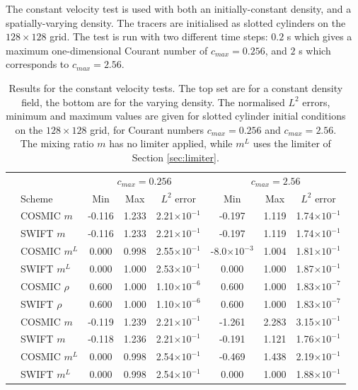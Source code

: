 \documentclass[11pt,a4paper]{article}
\begin{document}
The constant velocity test is used with both an initially-constant density, and a spatially-varying density.
The tracers are initialised as slotted cylinders on the $128\times 128$ grid.
The test is run with two different time steps: $0.2$ s which gives a maximum one-dimensional Courant number of $c_{max}=0.256$, and $2$ s which corresponds to $c_{max}=2.56$.
\\
\begin{table}[h!]
\small
\begin{center}
\begin{tabular}{| c | l | c c c | c c c | } \hline
  & & \multicolumn{3}{c|}{$c_{max}=0.256$} & \multicolumn{3}{c|}{$c_{max}=2.56$} \\
  & Scheme &  Min & Max & $L^2$ error & Min & Max & $L^2$ error   \\ \hline
  \parbox[t]{2mm}{}
  & COSMIC $m$ & -0.116 & 1.233 & 2.21$\times 10^{-1}$ & -0.197 & 1.119 & 1.74$\times 10^{-1}$ \\
  & SWIFT $m$ & -0.116 & 1.233 & 2.21$\times 10^{-1}$ & -0.197 & 1.119 & 1.74$\times 10^{-1}$ \\
  & COSMIC $m^L$ & 0.000 & 0.998 & 2.55$\times 10^{-1}$ & -8.0$\times 10^{-3}$ & 1.004 & 1.81$\times 10^{-1}$ \\
  & SWIFT  $m^L$ & 0.000 & 1.000 & 2.53$\times 10^{-1}$ & 0.000 & 1.000 & 1.87$\times 10^{-1}$ \\ \hline
  \parbox[t]{2mm}{}
  & COSMIC $\rho$ & 0.600 & 1.000 & 1.10$\times 10^{-6}$ & 0.600 & 1.000 & 1.83$\times 10^{-7}$ \\
  & SWIFT $\rho$ & 0.600 & 1.000 & 1.10$\times 10^{-6}$ & 0.600 & 1.000 & 1.83$\times 10^{-7}$ \\
  & COSMIC $m$ & -0.119 & 1.239 & 2.21$\times 10^{-1}$ & -1.261 & 2.283 & 3.15$\times 10^{-1}$ \\
  & SWIFT $m$ & -0.118 & 1.236 & 2.21$\times 10^{-1}$ & -0.191 & 1.121 & 1.76$\times 10^{-1}$ \\
  & COSMIC $m^L$ & 0.000 & 0.998 & 2.54$\times 10^{-1}$ & -0.469 & 1.438 & 2.19$\times 10^{-1}$ \\
  & SWIFT $m^L$ & 0.000 & 0.998 & 2.54$\times 10^{-1}$ & 0.000 & 1.000 & 1.88$\times 10^{-1}$ \\ \hline
\end{tabular}
\caption{Results for the constant velocity tests. The top set are for a constant density field, the bottom are for the varying density. The normalised $L^2$ errors, minimum and maximum values are given for slotted cylinder initial conditions on the $128\times128$ grid, for Courant numbers $c_{max}=0.256$ and $c_{max}=2.56$.
The mixing ratio $m$ has no limiter applied, while $m^L$ uses the limiter of Section \ref{sec:limiter}.}
\label{table:test1}
\end{center}
\end{table}
\end{document}
